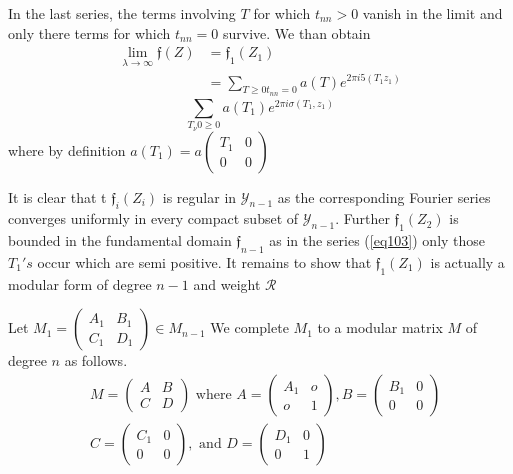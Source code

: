\setcounter{pageoriginal}{72}
In the last series, the terms involving $T$ for which $t_{n n}>0$
vanish in the limit and only there terms for which $t_{ n n} = 0$
survive. We than obtain  
\begin{align*}
\lim_{\lambda \to \infty} \mathfrak{f}(Z)& = \mathfrak{f}_1(Z_1)\\
& = \sum_{T \geq 0 t_{n n } = 0} a(T) e^{2 \pi i 5(T_1 z_1)}
\end{align*}
\begin{equation*}
\sum_{T_{\nu} 0 \geq 0} a(T_1) e^{2 \pi i \sigma (T_1, z_1)}\tag{103}\label{eq103}
\end{equation*}\pageoriginale
where by definition $a(T_1) = a \begin{pmatrix} T_1 & 0 \\ 0&
  0 \end{pmatrix}$ 

It is clear that t $\mathfrak{f}_i (Z_i)$ is regular in
$\mathscr{Y}_{n-1}$ as the corresponding Fourier series converges
uniformly in every compact subset of $\mathscr{Y}_{n-1}$. Further
$\mathfrak{f}_1 (Z_2)$ is bounded in the fundamental domain
$\mathfrak{f}_{n-1}$ as in the series (\ref{eq103}) only those $T_1's$ occur
which are semi positive. It remains to show that 
$\mathfrak{f}_1(Z_1)$ is actually a modular form of degree $n-1$ and
weight $\mathscr{R}$ 

Let $M_1  =  \begin{pmatrix} A_1 & B_1 \\ C_1 & D_1 \end{pmatrix} \in
M_{n-1}$ We complete $M_1$ to a modular matrix $M$ of degree $n$ as
follows. 
\begin{align*}
& M = \begin{pmatrix} A & B\\ C & D \end{pmatrix} \text{ where } A
  = \begin{pmatrix} A_1 & o \\ o & 1 \end{pmatrix} , B
  =\begin{pmatrix} B_1 & 0 \\ 0 & 0 \end{pmatrix} \\ 
& C = \begin{pmatrix} C_1 &0 \\ 0& 0 \end{pmatrix} ,\text{ and }
  D=\begin{pmatrix} D_1 & 0 \\ 0 & 1 \end{pmatrix}  
\end{align*}

